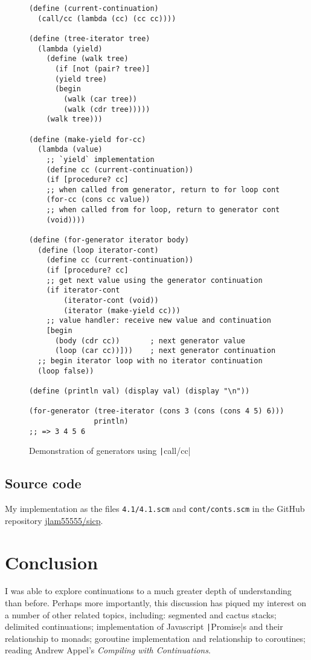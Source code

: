 \documentclass[]{article}
\begin{document}
\begin{figure}
  \centering
\begin{verbatim}
(define (current-continuation)
  (call/cc (lambda (cc) (cc cc))))

(define (tree-iterator tree)
  (lambda (yield)
    (define (walk tree)
      (if [not (pair? tree)]
	  (yield tree)
	  (begin
	    (walk (car tree))
	    (walk (cdr tree)))))
    (walk tree)))

(define (make-yield for-cc)
  (lambda (value)
    ;; `yield` implementation
    (define cc (current-continuation))
    (if [procedure? cc]
	;; when called from generator, return to for loop cont
	(for-cc (cons cc value))
	;; when called from for loop, return to generator cont
	(void))))

(define (for-generator iterator body)
  (define (loop iterator-cont)
    (define cc (current-continuation))
    (if [procedure? cc]
	;; get next value using the generator continuation
	(if iterator-cont
	    (iterator-cont (void))
	    (iterator (make-yield cc)))
	;; value handler: receive new value and continuation
	[begin
	  (body (cdr cc))       ; next generator value
	  (loop (car cc))]))    ; next generator continuation
  ;; begin iterator loop with no iterator continuation
  (loop false))

(define (println val) (display val) (display "\n"))

(for-generator (tree-iterator (cons 3 (cons (cons 4 5) 6)))
               println)
;; => 3 4 5 6
\end{verbatim}
  \caption{Demonstration of generators using \texttt|call/cc|}
  \label{fig:gene}
\end{figure}

\subsection{Source code}
\label{sec:sour}

My implementation as the files \texttt{4.1/4.1.scm} and \texttt{cont/conts.scm} in the GitHub repository \href{https://www.github.com/jlam55555/sicp}{jlam55555/sicp}.

\section{Conclusion}
\label{sec:conc}

I was able to explore continuations to a much greater depth of understanding than before. Perhaps more importantly, this discussion has piqued my interest on a number of other related topics, including: segmented and cactus stacks; delimited continuations; implementation of Javascript \texttt|Promise|s and their relationship to monads; goroutine implementation and relationship to coroutines; reading Andrew Appel's \textit{Compiling with Continuations}.
\end{document}

